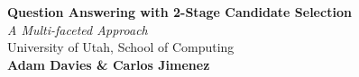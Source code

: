 \documentclass[a1,landscape]{a0poster}
\begin{document}
\begin{minipage}[c]{0.9\linewidth}
\centering
\huge \color{NavyBlue} \textbf{Question Answering with 2-Stage Candidate Selection} \color{Black}\\ %
\LARGE\textit{A Multi-faceted Approach}\\[1cm] %
\large{University of Utah, School of Computing}\\
\large \textbf{Adam Davies \& Carlos Jimenez}\\ %
\end{minipage}

\vspace{1cm} %

\end{document}
